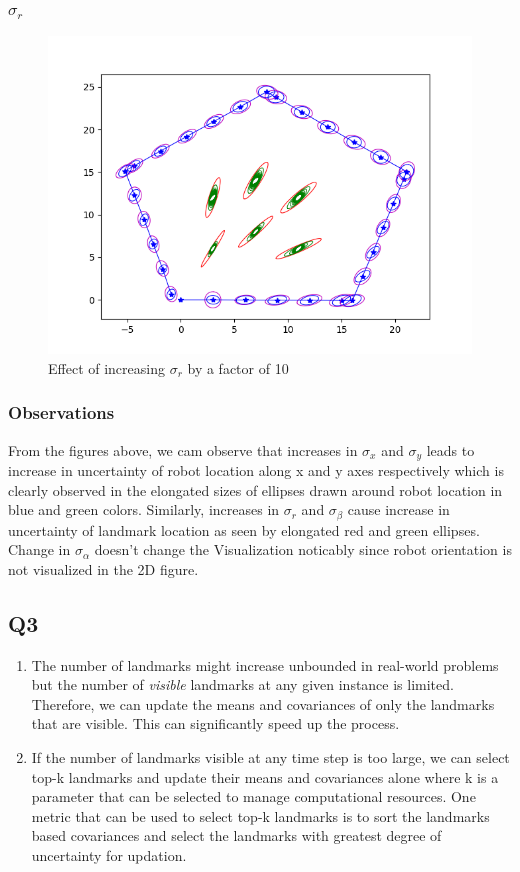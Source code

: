 \documentclass[12pt, a4paper]{article}
\begin{document}
\subsubsection{$\sigma_r$}
\begin{figure}[H]
  \centering
  \includegraphics[width=1\textwidth]{./results/q3_2/result_r.png}
  \caption{Effect of increasing $\sigma_r$ by a factor of 10}
\end{figure}
\subsubsection{Observations}
From the figures above, we cam observe that increases in $\sigma_x$ and $\sigma_y$ leads to increase in uncertainty of robot location along x and y axes respectively which is clearly observed in the elongated sizes of ellipses drawn around robot location in blue and green colors. Similarly, increases in $\sigma_{r}$ and $\sigma_{\beta}$  cause increase in uncertainty of landmark location as seen by elongated red and green ellipses. Change in $\sigma_{\alpha}$ doesn't change the Visualization noticably since robot orientation is not visualized in the 2D figure.
\subsection{Q3}
\begin{enumerate}
  \item The number of landmarks might increase unbounded in real-world problems but the number of \textit{visible} landmarks at any given instance is limited. Therefore, we can update the means and covariances of only the landmarks that are visible. This can significantly speed up the process.
  \item If the number of landmarks visible at any time step is too large, we can select top-k landmarks and update their means and covariances alone where k is a parameter that can be selected to manage computational resources. One metric that can be used to select top-k landmarks is to sort the landmarks based covariances and select the landmarks with greatest degree of uncertainty for updation. 
\end{enumerate}
\end{document}
